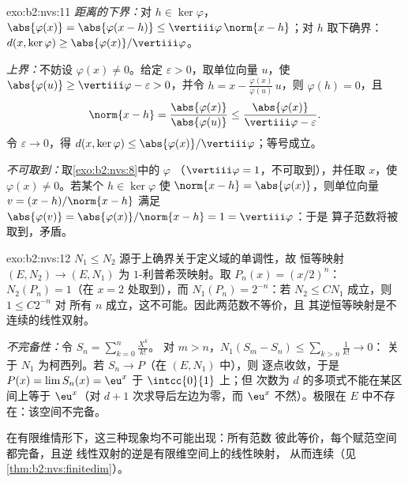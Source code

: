 \begin{solution}{exo:b2:nvs:11}
\emph{距离的下界：}对 $h \in \ker\varphi$，
$\abs{\varphi(x)} = \abs{\varphi(x - h)} \leq
\vertiii\varphi\,\norm{x - h}$；对 $h$ 取下确界：
$d(x, \ker\varphi) \geq \abs{\varphi(x)}/\vertiii\varphi$。

\emph{上界：}不妨设 $\varphi(x) \neq 0$。给定
$\varepsilon > 0$，取单位向量 $u$，使 $\abs{\varphi(u)} \geq
\vertiii\varphi - \varepsilon > 0$，并令 $h = x -
\frac{\varphi(x)}{\varphi(u)}\,u$，则 $\varphi(h) = 0$，且
\[
\norm{x - h} = \frac{\abs{\varphi(x)}}{\abs{\varphi(u)}}
\leq \frac{\abs{\varphi(x)}}{\vertiii\varphi - \varepsilon}.
\]
令 $\varepsilon \to 0$，得 $d(x, \ker\varphi) \leq
\abs{\varphi(x)}/\vertiii\varphi$；等号成立。

\emph{不可取到：}取\cref{exo:b2:nvs:8}中的 $\varphi$
（$\vertiii\varphi = 1$，不可取到），并任取 $x$，使
$\varphi(x) \neq 0$。若某个 $h \in \ker\varphi$ 使
$\norm{x - h} = \abs{\varphi(x)}$，则单位向量 $v = (x -
h)/\norm{x - h}$ 满足 $\abs{\varphi(v)} =
\abs{\varphi(x)}/\norm{x - h} = 1 = \vertiii\varphi$：于是
算子范数将被取到，矛盾。
\end{solution}

\begin{solution}{exo:b2:nvs:12}
$N_1 \leq N_2$ 源于上确界关于定义域的单调性，故
恒等映射 $(E, N_2) \to (E, N_1)$ 为 $1$-利普希茨映射。取 $P_n(x) =
(x/2)^n$：$N_2(P_n) = 1$（在 $x = 2$ 处取到），而 $N_1(P_n) =
2^{-n}$：若 $N_2 \leq CN_1$ 成立，则 $1 \leq C2^{-n}$ 对
所有 $n$ 成立，这不可能。因此两范数不等价，且
其逆恒等映射是不连续的线性双射。

\emph{不完备性：}令 $S_n = \sum_{k=0}^{n}\frac{X^k}{k!}$。
对 $m > n$，$N_1(S_m - S_n) \leq \sum_{k>n}\frac1{k!} \to 0$：
关于 $N_1$ 为柯西列。若 $S_n \to P$（在 $(E, N_1)$ 中），则
逐点收敛，于是 $P(x) = \lim S_n(x) = \eu^x$ 于 $\intcc{0}{1}$ 上；但
次数为 $d$ 的多项式不能在某区间上等于 $\eu^x$（对
$d + 1$ 次求导后左边为零，而 $\eu^x$ 不然）。极限在
$E$ 中不存在：该空间不完备。

在有限维情形下，这三种现象均不可能出现：所有范数
彼此等价，每个赋范空间都完备，且逆
线性双射的逆是有限维空间上的线性映射，
从而连续（见\cref{thm:b2:nvs:finitedim}）。
\end{solution}

